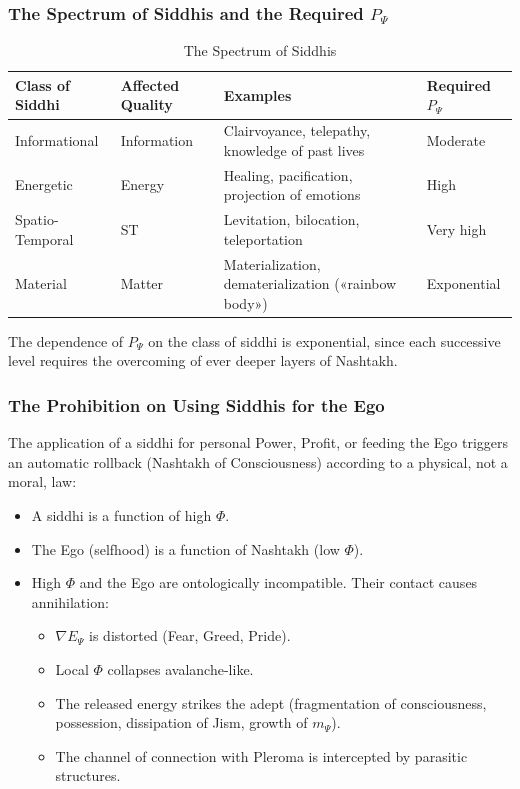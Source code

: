 \documentclass[a4paper,12pt]{article}
\begin{document}
	\subsubsection{The Spectrum of Siddhis and the Required $P_{\Psi}$}
	
	\begin{table}[H]
		\centering
		\begin{tabular}{|p{3cm}|p{2cm}|p{4.5cm}|p{2cm}|}
			\hline
			\textbf{Class of Siddhi} & \textbf{Affected Quality} & \textbf{Examples} & \textbf{Required $P_{\Psi}$} \\
			\hline
			Informational & Information & Clairvoyance, telepathy, knowledge of past lives & Moderate \\
			\hline
			Energetic & Energy & Healing, pacification, projection of emotions & High \\
			\hline
			Spatio-Temporal & ST & Levitation, bilocation, teleportation & Very high \\
			\hline
			Material & Matter & Materialization, dematerialization («rainbow body») & Exponential \\
			\hline
		\end{tabular}
		\caption{The Spectrum of Siddhis}
	\end{table}
	
	The dependence of $P_{\Psi}$ on the class of siddhi is exponential, since each successive level requires the overcoming of ever deeper layers of Nashtakh.
	
	\subsubsection{The Prohibition on Using Siddhis for the Ego}
	
	The application of a siddhi for personal Power, Profit, or feeding the Ego triggers an automatic rollback (Nashtakh of Consciousness) according to a physical, not a moral, law:
	
	\begin{itemize}
		\item A siddhi is a function of high $\Phi$.
		\item The Ego (selfhood) is a function of Nashtakh (low $\Phi$).
		\item High $\Phi$ and the Ego are ontologically incompatible. Their contact causes annihilation:
		\begin{itemize}
			\item $\nabla E_{\Psi}$ is distorted (Fear, Greed, Pride).
			\item Local $\Phi$ collapses avalanche-like.
			\item The released energy strikes the adept (fragmentation of consciousness, possession, dissipation of Jism, growth of $m_{\Psi}$).
			\item The channel of connection with Pleroma is intercepted by parasitic structures.
		\end{itemize}
	\end{itemize}
	
\end{document}
